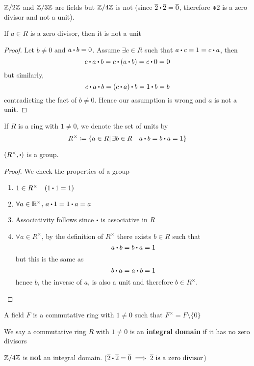 \documentclass[../Main.tex]{subfiles}
\begin{document}
\begin{example}
	$\mathbb{Z}/2\mathbb{Z}$ and $\mathbb{Z}/3\mathbb{Z}$ are fields but $\mathbb{Z}/4\mathbb{Z}$ is not (since $\obar{2}\rdot \obar{2} = \obar{0}$, therefore $\obar{2}$ is a zero divisor and not a unit).
\end{example}
\newpage
\begin{claim}
	If $a\in R$ is a zero divisor, then it is not a unit
\end{claim}
\begin{proof}
	Let $b\ne 0$ and $a\rdot b=0$.\newline
	Assume $\exists c\in R$ such that $a\rdot c=1=c\rdot a$, then
	\[c\rdot a\rdot b=c\rdot (a\rdot b)=c\rdot 0=0\]
	but similarly,
	\[c\rdot a\rdot b=(c\rdot a)\rdot b=1\rdot b=b\]
	contradicting the fact of $b\ne0$. Hence our assumption is wrong and $a$ is not a unit.
\end{proof}
\begin{dfn}[title=Group of Units]
	If $R$ is a ring with $1\ne0$, we denote the set of units by 
	\[R^\times \coloneqq\{a\in R|\, \exists b\in R \quad a\rdot b=b\rdot a=1\}\]
\end{dfn}
\begin{claim}
	$(R^\times,\rdot )$ is a group.
\end{claim}
\begin{proof} We check the properties of a group
	\begin{enumerate}
		\item $1 \in R^\times \quad (1\rdot 1=1)$
		\item $\forall a \in \R^\times,\, a\rdot 1=1\rdot a=a$
		\item Associativity follows since $\rdot$ is associative in $R$
		\item $\forall a \in R^\times$, by the definition of $R^\times$ there exists $b\in R$ such that
		\[a\rdot b=b\rdot a=1\]
		but this is the same as
		\[b\rdot a=a\rdot b=1\]
		hence $b$, the inverse of $a$, is also a unit and therefore $b\in R^\times$.
	\end{enumerate}
\end{proof}
A field $F$ is a commutative ring with $1\ne 0$ such that $F^\times = F \setminus\{0\}$
\begin{dfn}[title= Integral Domain]
	We say a commutative ring $R$ with $1\ne 0$ is an \textbf{integral domain} if it has no zero divisors
\end{dfn}
\begin{example}
	$\mathbb{Z}/4\mathbb{Z}$ is \textbf{not} an integral domain. ($\obar{2}\rdot \obar{2}=\obar{0}\implies \obar{2} \textrm{ is a zero divisor}$)
\end{example}
\end{document}
